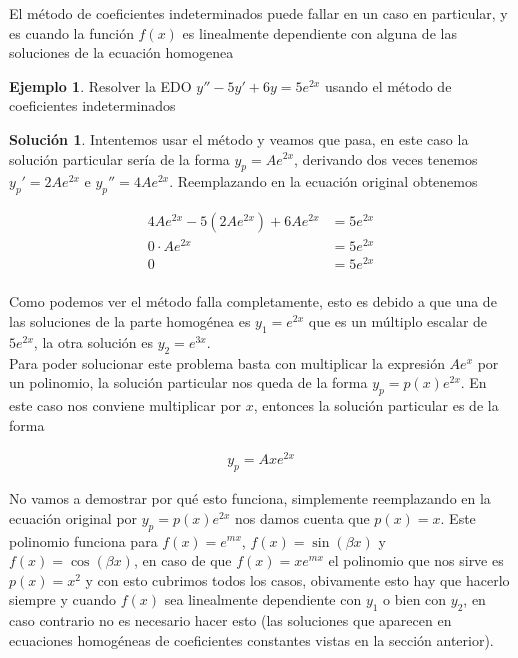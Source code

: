 \documentclass{article}
\theoremstyle{plain}
\theoremstyle{definition}
\newtheorem{ejem}[thm]{Ejemplo}
\newtheorem{sol}[thm]{Solución}
\begin{document}
El método de coeficientes indeterminados puede fallar en un caso en particular, y es cuando la función $f(x)$ es linealmente dependiente con alguna de las soluciones de la ecuación homogenea \\

\begin{ejem}Resolver la EDO $y''-5y'+6y=5e^{2x}$ usando el método de coeficientes indeterminados \\
\end{ejem}

\begin{sol}Intentemos usar el método y veamos que pasa, en este caso la solución particular sería de la forma $y_p = Ae^{2x}$, derivando dos veces tenemos $y_p'=2Ae^{2x}$ e $y_p'' = 4Ae^{2x}$. Reemplazando en la ecuación original obtenemos
\end{sol}

\begin{align*}
    4Ae^{2x}-5(2Ae^{2x})+6Ae^{2x} &=5e^{2x} \\
    0 \cdot Ae^{2x} &=5e^{2x} \\
    0&=5e^{2x} \\
\end{align*}

Como podemos ver el método falla completamente, esto es debido a que una de las soluciones de la parte homogénea es $y_1=e^{2x}$ que es un múltiplo escalar de $5e^{2x}$, la otra solución es $y_2=e^{3x}$. \\

Para poder solucionar este problema basta con multiplicar la expresión $Ae^x$ por un polinomio, la solución particular nos queda de la forma $y_p =p(x)e^{2x}$. En este caso nos conviene multiplicar por $x$,  entonces la solución particular es de la forma

\begin{align*}
    y_p= Axe^{2x}
\end{align*}

No vamos a demostrar por qué esto funciona, simplemente reemplazando en la ecuación original por  $y_p =p(x)e^{2x}$ nos damos cuenta que $p(x)=x$. Este polinomio funciona para $f(x)=e^{m x}$, $f(x) = \sin(\beta x)$ y $f(x)= \cos(\beta x)$, en caso de que $f(x)=xe^{mx}$ el polinomio que nos sirve es $p(x)=x^2$ y con esto cubrimos todos los casos, obivamente esto hay que hacerlo siempre y cuando $f(x)$ sea linealmente dependiente con $y_1$ o bien con $y_2$, en caso contrario no es necesario hacer esto (las soluciones que aparecen en ecuaciones homogéneas de coeficientes constantes vistas en la sección anterior). \\
\end{document}
